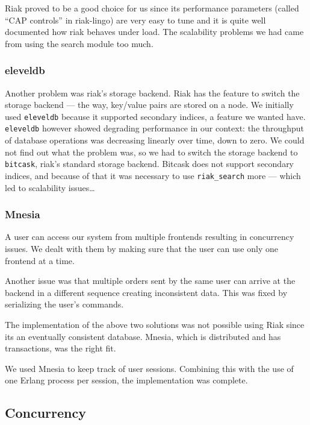 \documentclass[11pt,a4paper]{report}
\begin{document}
Riak proved to be a good choice for us since its performance parameters (called
``CAP controls'' in riak-lingo) are very easy to tune and it is quite well
documented how riak behaves under load. The scalability problems we had
came from using the search module too much.
\subsubsection{eleveldb}
Another problem was riak's storage backend. Riak has the feature to switch the
storage backend --- the way, key/value pairs are stored on a node.
We initially used {\tt eleveldb} because it supported secondary indices, a
feature we wanted have. {\tt eleveldb} however showed degrading performance
in our context: the throughput of database operations was decreasing linearly
over time, down to zero. We could not find out what the problem was, so
we had to switch the storage backend to {\tt bitcask}, riak's standard storage
backend. Bitcask does not support secondary indices, and because of that it was
necessary to use {\tt riak\_search} more --- which led to scalability
issues\ldots

\subsubsection{Mnesia}
A user can access our system from multiple frontends resulting in
concurrency issues. We dealt with them by making sure that the user
can use only one frontend at a time.

Another issue was that multiple orders sent by the same user can arrive at the
backend in a different sequence creating inconsistent data. This was
fixed by serializing the user's commands.

The implementation of the above two solutions was not possible using Riak since
its an eventually consistent database. Mnesia, which is distributed and has
transactions, was the right fit.

We used Mnesia to keep track of user sessions. Combining this with
the use of one Erlang process per session, the implementation was complete.

\subsection{Concurrency}
\label{sec:concurrency}
\end{document}
